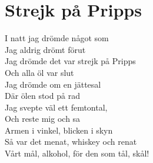 \section{Strejk på Pripps}
I natt jag drömde något som\\
Jag aldrig drömt förut\\
Jag drömde det var strejk på Pripps\\
Och alla öl var slut\\
Jag drömde om en jättesal\\
Där ölen stod på rad\\
Jag svepte väl ett femtontal,\\
Och reste mig och sa\\
Armen i vinkel, blicken i skyn\\
Så var det menat, whiskey och renat\\
Vårt mål, alkohol, för den som tål, skål!\\
